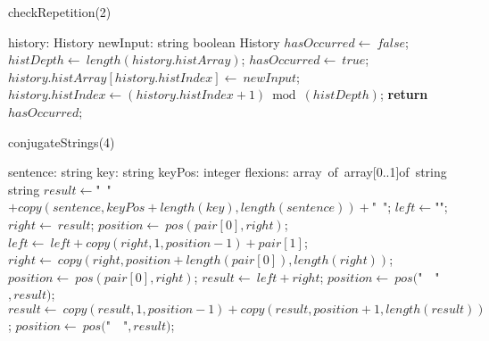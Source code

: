\documentclass[a4paper,10pt]{article}
\begin{document}
\begin{algorithm}
\caption{checkRepetition(2)}
\begin{algorithmic}[5]
\State {}
\State {}
    \State history: History
    \State newInput: string
  \EndDecl
    \State boolean
  \EndDecl
    \State History
  \EndDecl
  \State \(hasOccurred\gets\ false\);
    \State \(histDepth\gets\ length(history.histArray)\);
        \State \(hasOccurred\gets\ true\);
      \EndIf
    \EndFor
    \State \(history.histArray[history.histIndex]\gets\ newInput\);
    \State \(history.histIndex\gets(history.histIndex+1)\bmod(histDepth)\);
  \EndIf
  \State \textbf{return} \(hasOccurred\);
\EndFunction
\end{algorithmic}
\end{algorithm}


\begin{algorithm}
\caption{conjugateStrings(4)}
\begin{algorithmic}[5]
    \State sentence: string
    \State key: string
    \State keyPos: integer
    \State flexions: array\ of\ array[0..1]of\ string
  \EndDecl
    \State string
  \EndDecl
  \State \(result\gets\)"{}\ "{}\(+copy(sentence,keyPos+length(key),length(sentence))+\)"{}\ "{}\(\);
    \State \(left\gets\)"{}"{}\(\);
    \State \(right\gets\ result\);
    \State \(position\gets\ pos(pair[0],right)\);
      \State \(left\gets\ left+copy(right,1,position-1)+pair[1]\);
      \State \(right\gets\ copy(right,position+length(pair[0]),length(right))\);
      \State \(position\gets\ pos(pair[0],right)\);
    \EndWhile
    \State \(result\gets\ left+right\);
  \EndFor
  \State \(position\gets\ pos(\)"{}\ \ "{}\(,result)\);
    \State \(result\gets\ copy(result,1,position-1)+copy(result,position+1,length(result))\);
    \State \(position\gets\ pos(\)"{}\ \ "{}\(,result)\);
  \EndWhile
\EndFunction
\end{algorithmic}
\end{algorithm}
\end{document}
